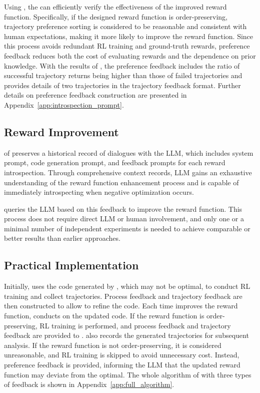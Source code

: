 \documentclass{article}
\theoremstyle{plain}
\theoremstyle{definition}
\theoremstyle{remark}
\begin{document}
Using \TPE, the \critic can efficiently verify the effectiveness of the improved reward function. Specifically, if the designed reward function is order-preserving, trajectory preference sorting is considered to be reasonable and consistent with human expectations, making it more likely to improve the reward function. 
Since this process avoids redundant RL training and ground-truth rewards, preference feedback reduces both the cost of evaluating rewards and the dependence on prior knowledge. With the results of \TPE, the preference feedback includes the ratio of successful trajectory returns being higher than those of failed trajectories and provides details of two trajectories in the trajectory feedback format. Further details on preference feedback construction are presented in Appendix~\ref{app:introspection_prompt}.




\subsection{Reward Improvement}\label{sec:reward_improvement}

\designer of \ourmethod preserves a historical record of dialogues with the LLM, which includes system prompt, code generation prompt, and feedback prompts for each reward introspection. Through comprehensive context records, LLM gains an exhaustive understanding of the reward function enhancement process and is capable of immediately introspecting when negative optimization occurs.


\designer queries the LLM based on this feedback to improve the reward function. This process does not require direct LLM or human involvement, and only one or a minimal number of independent experiments is needed to achieve comparable or better results than earlier approaches. 

\subsection{Practical Implementation}\label{sec:practical_implementation}

Initially, \critic uses the code generated by \designer, which may not be optimal, to conduct RL training and collect trajectories. Process feedback and trajectory feedback are then constructed to allow \designer to refine the code. Each time \designer improves the reward function, \critic conducts \TPE on the updated code. If the reward function is order-preserving, RL training is performed, and process feedback and trajectory feedback are provided to \designer. \critic also records the generated trajectories for subsequent \TPE analysis. If the reward function is not order-preserving, it is considered unreasonable, and RL training is skipped to avoid unnecessary cost. Instead, preference feedback is provided, informing the LLM that the updated reward function may deviate from the optimal. The whole algorithm of \ourmethod with three types of feedback is shown in Appendix~\ref{app:full_algorithm}.
\end{document}
